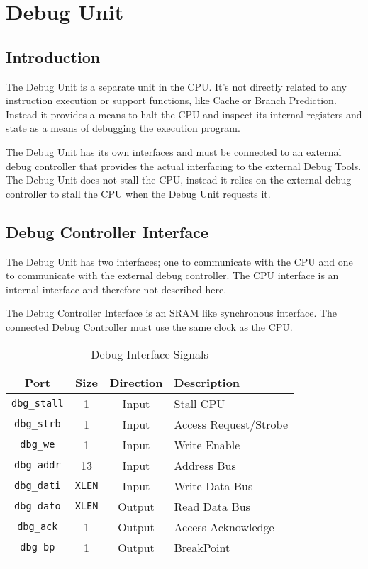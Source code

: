 \chapter{Debug Unit}\label{debug-unit-1}

\section{Introduction}\label{introduction-4}

The Debug Unit is a separate unit in the CPU. It's not directly related
to any instruction execution or support functions, like Cache or Branch
Prediction. Instead it provides a means to halt the CPU and inspect its
internal registers and state as a means of debugging the execution
program.

The Debug Unit has its own interfaces and must be connected to an
external debug controller that provides the actual interfacing to the
external Debug Tools. The Debug Unit does not stall the CPU, instead it
relies on the external debug controller to stall the CPU when the Debug
Unit requests it.

\section{Debug Controller Interface
}\label{debug-controller-interface}

The Debug Unit has two interfaces; one to communicate with the CPU and
one to communicate with the external debug controller. The CPU interface
is an internal interface and therefore not described here.

The Debug Controller Interface is an SRAM like synchronous interface.
The connected Debug Controller must use the same clock as the CPU.

\begin{longtable}[]{@{}cccl@{}}
\toprule
Port & Size & Direction & Description\tabularnewline
\midrule
\endhead
\texttt{dbg\_stall} & 1 & Input & Stall CPU\tabularnewline
\texttt{dbg\_strb}  & 1 & Input & Access Request/Strobe\tabularnewline
\texttt{dbg\_we}    & 1 & Input & Write Enable\tabularnewline
\texttt{dbg\_addr}  & 13 & Input & Address Bus\tabularnewline
\texttt{dbg\_dati}  & \texttt{XLEN} & Input & Write Data Bus\tabularnewline
\texttt{dbg\_dato}  & \texttt{XLEN} & Output & Read Data Bus\tabularnewline
\texttt{dbg\_ack}   & 1 & Output & Access Acknowledge\tabularnewline
\texttt{dbg\_bp}    & 1 & Output & BreakPoint\tabularnewline
\bottomrule
\caption{Debug Interface Signals}
\label{tab:debug-if-signals}
\end{longtable}

